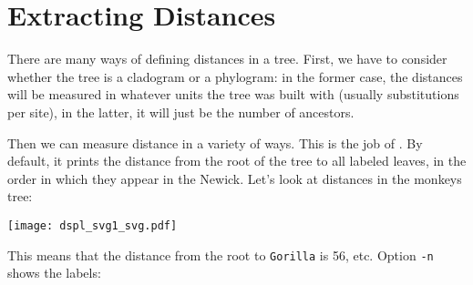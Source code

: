\section{Extracting Distances}

There are many ways of defining distances in a tree. First, we have to consider
whether the tree is a cladogram or a phylogram: in the former case, the
distances will be measured in whatever units the tree was built with (usually
substitutions per site), in the latter, it will just be the number of ancestors.

Then we can measure distance in a variety of ways. This is the job of
\distance. By default, it prints the distance from the root of the tree to all
labeled leaves, in the order in which they appear in the Newick. Let's look at
distances in the monkeys tree:

\begin{center}
\texttt{[image: dspl\_svg1\_svg.pdf]}
\end{center}


\begin{samepage}

\end{samepage}
This means that the distance from the root to \texttt{Gorilla} is 56, etc. Option \texttt{-n} shows the labels:

\begin{samepage}

\end{samepage}




